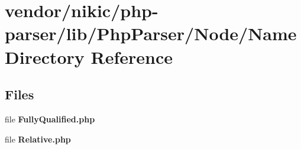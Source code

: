 \section{vendor/nikic/php-\/parser/lib/\+Php\+Parser/\+Node/\+Name Directory Reference}
\label{dir_0fcc2e214b7e9fc76a9389cd38e052ac}
\subsection*{Files}
\begin{DoxyCompactItemize}
\item 
file {\bf Fully\+Qualified.\+php}
\item 
file {\bf Relative.\+php}
\end{DoxyCompactItemize}
